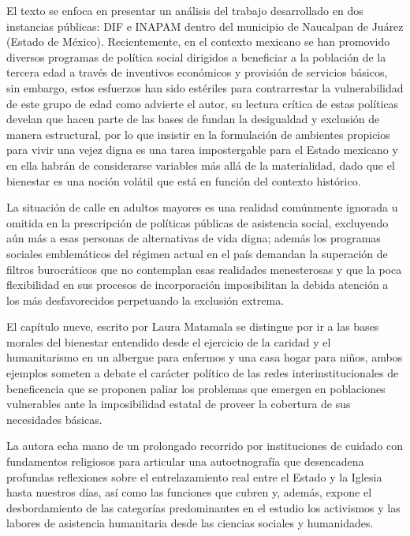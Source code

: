 \documentclass[
  spanish,
  11pt,
  a4paper,
]{scrbook}
\begin{document}
El texto se enfoca en presentar un análisis del trabajo desarrollado en
dos instancias públicas: DIF e INAPAM dentro del municipio de Naucalpan
de Juárez (Estado de México). Recientemente, en el contexto mexicano se
han promovido diversos programas de política social dirigidos a
beneficiar a la población de la tercera edad a través de inventivos
económicos y provisión de servicios básicos, sin embargo, estos
esfuerzos han sido estériles para contrarrestar la vulnerabilidad de
este grupo de edad como advierte el autor, su lectura crítica de estas
políticas develan que hacen parte de las bases de fundan la desigualdad
y exclusión de manera estructural, por lo que insistir en la formulación
de ambientes propicios para vivir una vejez digna es una tarea
impostergable para el Estado mexicano y en ella habrán de considerarse
variables más allá de la materialidad, dado que el bienestar es una
noción volátil que está en función del contexto histórico.

La situación de calle en adultos mayores es una realidad comúnmente
ignorada u omitida en la prescripción de políticas públicas de
asistencia social, excluyendo aún más a esas personas de alternativas de
vida digna; además los programas sociales emblemáticos del régimen
actual en el país demandan la superación de filtros burocráticos que no
contemplan esas realidades menesterosas y que la poca flexibilidad en
sus procesos de incorporación imposibilitan la debida atención a los más
desfavorecidos perpetuando la exclusión extrema.

\vspace*{.75cm}

El capítulo nueve, escrito por Laura Matamala se distingue por ir a las
bases morales del bienestar entendido desde el ejercicio de la caridad y
el humanitarismo en un albergue para enfermos y una casa hogar para
niños, ambos ejemplos someten a debate el carácter político de las redes
interinstitucionales de beneficencia que se proponen paliar los
problemas que emergen en poblaciones vulnerables ante la imposibilidad
estatal de proveer la cobertura de sus necesidades básicas.

La autora echa mano de un prolongado recorrido por instituciones de
cuidado con fundamentos religiosos para articular una autoetnografía que
desencadena profundas reflexiones sobre el entrelazamiento real entre el
Estado y la Iglesia hasta nuestros días, así como las funciones que
cubren y, además, expone el desbordamiento de las categorías
predominantes en el estudio los activismos y las labores de asistencia
humanitaria desde las ciencias sociales y humanidades.
\end{document}
